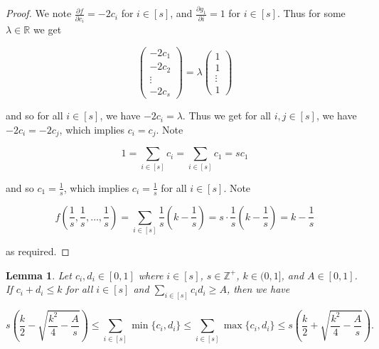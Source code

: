 \documentclass{article}
\newtheorem{lemma}{Lemma}
\begin{document}
\begin{proof}
We note $\frac{\partial f}{\partial c_i} = - 2c_i$ for $i \in [s]$, and $\frac{\partial g_1}{\partial i} = 1$ for $i \in [s]$. Thus for some $\lambda \in \mathbb{R}$ we get

$$
\begin{pmatrix}
-2c_1 \\
-2c_2 \\
\vdots \\
-2c_s
\end{pmatrix} =
\lambda \begin{pmatrix}
1 \\
1 \\
\vdots \\
1
\end{pmatrix}
$$

\noindent
and so for all $i \in [s]$, we have $-2c_i = \lambda$. Thus we get for all $i,j \in [s]$, we have $-2c_i = -2c_j$, which implies $c_i = c_j$. Note

$$1 = \sum_{i \in [s]} c_i = \sum_{i \in [s]} c_1 = sc_1$$

\noindent
and so $c_1 = \frac{1}{s}$, which implies $c_i = \frac{1}{s}$ for all $i \in [s]$. Note 

$$f(\frac{1}{s},\frac{1}{s},\ldots,\frac{1}{s}) = \sum_{i \in [s]} \frac{1}{s}(k-\frac{1}{s}) = s \cdot \frac{1}{s}(k-\frac{1}{s}) = k-\frac{1}{s}$$

\noindent
as required. 
\end{proof}

\begin{lemma}
Let $c_i, d_i \in [0,1]$ where $i \in [s]$, $s \in \mathbb{Z}^{+}$, $k \in (0,1]$, and $A \in [0,1]$. If $c_i + d_i \leq k$ for all $i \in [s]$ and $\sum_{i \in [s]} c_id_i \geq A$, then we have 

$$s(\frac{k}{2} - \sqrt{\frac{k^2}{4}-\frac{A}{s}}) \leq \sum_{i \in [s]} \min\{c_i,d_i\} \leq \sum_{i \in [s]} \max\{c_i,d_i\} \leq s(\frac{k}{2} + \sqrt{\frac{k^2}{4}-\frac{A}{s}}).$$ 
\end{lemma}
\end{document}
